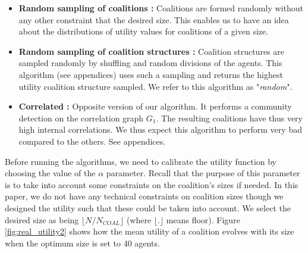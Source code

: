 \documentclass[journal]{IEEEtran}
\begin{document}
\begin{itemize}
\item \textbf{Random sampling of coalitions :} Coalitions are formed randomly without any other constraint that the desired size. This enables us to have an idea about the distributions of utility values for coalitions of a given size.
\item \textbf{Random sampling of coalition structures :} Coalition structures are sampled randomly by shuffling and random divisions of the agents. This algorithm (see appendices) uses such a sampling and returns the highest utility coalition structure sampled. We refer to this algorithm as "\textit{random}".
\item \textbf{Correlated :} Opposite version of our algorithm. It performs a community detection on the correlation graph $ G_{1} $. The resulting coalitions have thus very high internal correlations. We thus expect this algorithm to perform very bad compared to the others. See appendices.
\end{itemize} 


Before running the algorithms, we need to calibrate the utility function by choosing the value of the $ \alpha $ parameter. Recall that the purpose of this parameter is to take into account some constraints on the coalition's sizes if needed. In this paper, we do not have any technical constraints on coalition sizes though we designed the utility such that these could be taken into account. We select the desired size as being $ \lfloor N/N_{COAL} \rfloor $ (where $ \lfloor.\rfloor $ means floor). Figure \ref{fig:real_utility2} shows how the mean utility of a coalition evolves with its size when the optimum size is set to 40 agents.
\end{document}
